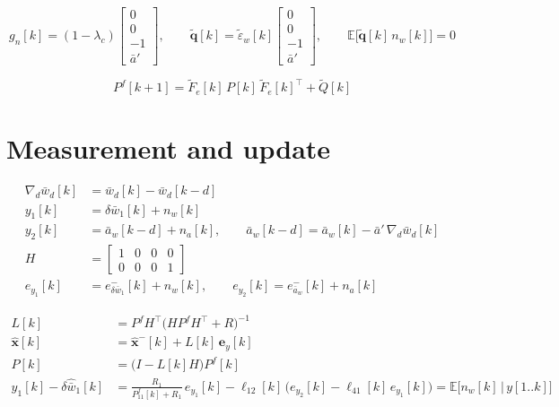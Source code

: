 \documentclass[11pt,a4paper,fontset=none]{ctexart}
\newcommand{\ba}{\bar{a}}
\newcommand{\bw}{\bar{w}}
\newcommand{\E}{\mathbb{E}}
\newcommand{\ap}{\ba'}
\newcommand{\et}{\tilde{\varepsilon}_w}
\begin{document}
\begin{equation*}
g_n[k] = (1-\lambda_c)\begin{bmatrix} 0 \\ 0 \\ -1 \\ \ap \end{bmatrix} , \qquad
\tilde{\mathbf{q}}[k] = \et[k]\begin{bmatrix} 0 \\ 0 \\ -1 \\ \ap \end{bmatrix} , \qquad
\E\bigl[\tilde{\mathbf{q}}[k]\,n_w[k]\bigr] = 0
\end{equation*}

\begin{equation*}
P^{f}[k+1] = \tilde{F}_e[k]\,P[k]\,\tilde{F}_e[k]^{\top} + \tilde{Q}[k]
\end{equation*}

\section{Measurement and update}

\begin{align*}
\nabla_d\bw_d[k] &= \bw_d[k] - \bw_d[k-d] \\
y_1[k] &= \delta\bw_1[k] + n_w[k] \\
y_2[k] &= \ba_w[k-d] + n_a[k], \qquad \ba_w[k-d] = \ba_w[k] - \ap\,\nabla_d\bw_d[k] \\
H &= \begin{bmatrix} 1 & 0 & 0 & 0 \\ 0 & 0 & 0 & 1 \end{bmatrix} \\
e_{y_1}[k] &= e^{-}_{\delta\bw_1}[k] + n_w[k], \qquad e_{y_2}[k] = e^{-}_{\ba_w}[k] + n_a[k]
\end{align*}

\begin{align*}
L[k]         &= P^{f}H^{\top}\bigl(HP^{f}H^{\top} + R\bigr)^{-1} \\
\hat{\mathbf{x}}[k] &= \hat{\mathbf{x}}^{-}[k] + L[k]\,\mathbf{e}_y[k] \\
P[k]         &= \bigl(I - L[k]H\bigr)P^{f}[k] \\
y_1[k] - \delta\hat{\bw}_1[k] &= \frac{R_1}{P^{f}_{11}[k] + R_1}\,e_{y_1}[k] - \ell_{12}[k]\,\bigl(e_{y_2}[k] - \ell_{41}[k]\,e_{y_1}[k]\bigr)
   = \E\bigl[n_w[k]\,\big|\,y[1..k]\bigr]
\end{align*}
\end{document}
